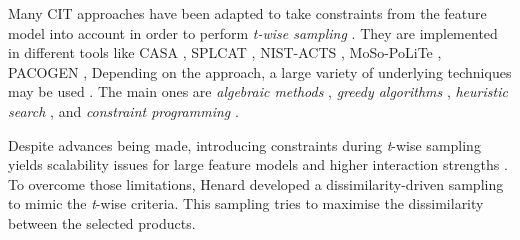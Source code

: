 %

Many \gls{CIT} approaches have been adapted to take constraints from the feature model into account in order to perform \emph{\textit{t}-wise sampling} \cite{Cohen2008,Lopez-Herrejon2015a}. They are implemented in different tools like CASA \cite{Garvin2009,Garvin2011}, SPLCAT \cite{Johansen2012}, NIST-ACTS \cite{Lei2007}, MoSo-PoLiTe \cite{Oster2010}, PACOGEN \cite{Hervieu2011}, \etc Depending on the approach, a large variety of underlying techniques may be used \cite{Calvagna2013a,Lopez-Herrejon2015a}. 
The main ones \cite{Cohen2008,Lamancha2015} are 
\emph{algebraic methods} \cite{Calvagna2008,Sherwood1994,Hartman2005}, 
\emph{greedy algorithms} \cite{Garvin2009,Garvin2011,Cohen1997,Lott2005a,Czerwonka2006,Sherwood1994,Bryce2009,Bryce2006,Bryce2007,Lamancha2015,Lei2008,Johansen2011,Johansen2012b,Johansen2012}, 
\emph{heuristic search} \cite{Garvin2009a,Cohen2003}, 
and \emph{constraint programming} \cite{Oster2010,Marijan2013,Patel2013,Patel2013a,Hervieu2011,Perrouin2011}.

Despite advances being made, introducing constraints during \textit{t}-wise sampling yields scalability issues for large feature models \cite{Arcuri2012,Grindal2005,Nie2011,Henard2014a} and higher interaction strengths \cite{Kuhn2008,Reisner2010,Petke2013,Henard2014a}. To overcome those limitations, Henard \etal \cite{Henard2014a} developed a dissimilarity-driven sampling to mimic the \textit{t}-wise criteria. This sampling tries to maximise the dissimilarity between the selected products.


